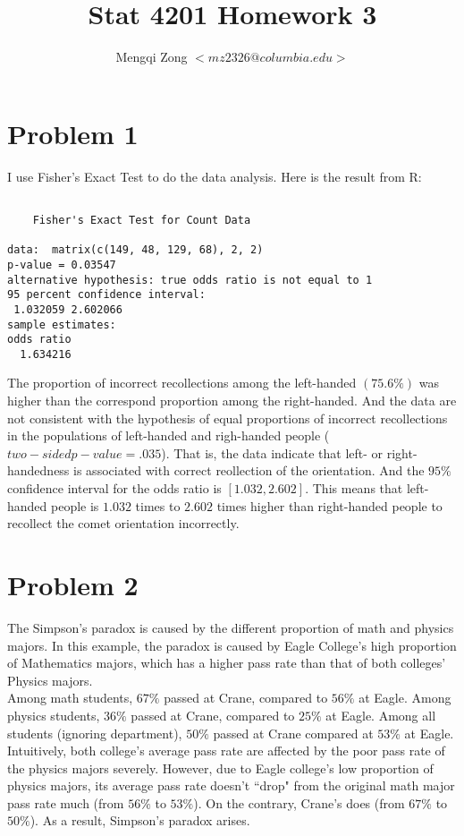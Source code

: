 \documentclass[12pt]{article}
\title{Stat 4201 Homework 3}
\author{Mengqi Zong $<mz2326@columbia.edu>$}
\begin{document}
\maketitle

\section*{Problem 1}

I use Fisher's Exact Test to do the data analysis. Here is the result
from R:

\begin{verbatim}

	Fisher's Exact Test for Count Data

data:  matrix(c(149, 48, 129, 68), 2, 2) 
p-value = 0.03547
alternative hypothesis: true odds ratio is not equal to 1 
95 percent confidence interval:
 1.032059 2.602066 
sample estimates:
odds ratio 
  1.634216 

\end{verbatim}

The proportion of incorrect recollections among the left-handed
$(75.6\%)$ was higher than the correspond proportion among the
right-handed. And the data are not consistent with the hypothesis of
equal proportions of incorrect recollections in the populations of
left-handed and righ-handed people ($two-sided p-value = .035$). That
is, the data indicate that left- or right-handedness is associated
with correct reollection of the orientation. And the $95\%$ confidence
interval for the odds ratio is $[1.032, 2.602]$. This means that
left-handed people is $1.032$ times to $2.602$ times higher than
right-handed people to recollect the comet orientation incorrectly.

\section*{Problem 2}

The Simpson's paradox is caused by the different proportion of math
and physics majors. In this example, the paradox is caused by Eagle
College's high proportion of Mathematics majors, which has a higher
pass rate than that of both colleges' Physics majors.\\

Among math students, $67\%$ passed at Crane, compared to $56\%$ at
Eagle. Among physics students, $36\%$ passed at Crane, compared to
$25\%$ at Eagle. Among all students (ignoring department), $50\%$
passed at Crane compared at $53\%$ at Eagle. Intuitively, both
college's average pass rate are affected by the poor pass rate of the
physics majors severely. However, due to Eagle college's low 
proportion of physics majors, its average pass rate doesn't ``drop"
from the original math major pass rate much (from $56\%$ to
$53\%$). On the contrary, Crane's does (from $67\%$ to $50\%$). As a
result, Simpson's paradox arises.\\
\end{document}
